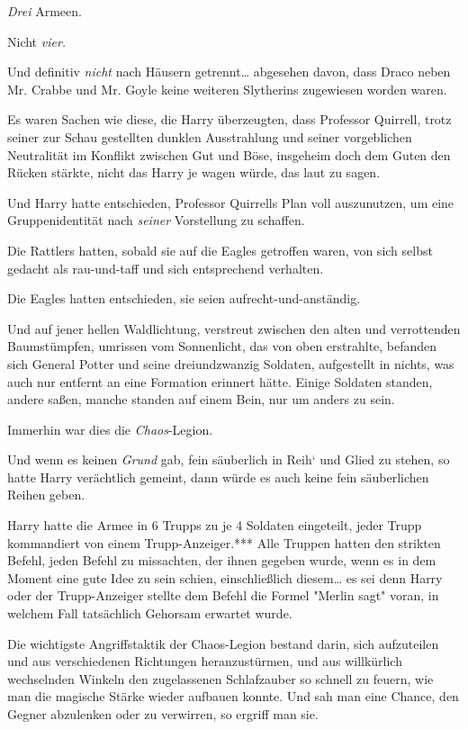 {\emph{Drei} Armeen.

Nicht \emph{vier.}

Und definitiv \emph{nicht} nach Häusern getrennt… abgesehen davon, dass Draco neben Mr. Crabbe und Mr. Goyle keine weiteren Slytherins zugewiesen worden waren.

Es waren Sachen wie diese, die Harry überzeugten, dass Professor Quirrell, trotz seiner zur Schau gestellten dunklen Ausstrahlung und seiner vorgeblichen Neutralität im Konflikt zwischen Gut und Böse, insgeheim doch dem Guten den Rücken stärkte, nicht das Harry je wagen würde, das laut zu sagen.

Und Harry hatte entschieden, Professor Quirrells Plan voll auszunutzen, um eine Gruppenidentität nach \emph{seiner} Vorstellung zu schaffen.

Die Rattlers hatten, sobald sie auf die Eagles getroffen waren, von sich selbst gedacht als rau-und-taff und sich entsprechend verhalten.

Die Eagles hatten entschieden, sie seien aufrecht-und-anständig.

Und auf jener hellen Waldlichtung, verstreut zwischen den alten und verrottenden Baumstümpfen, umrissen vom Sonnenlicht, das von oben erstrahlte, befanden sich General Potter und seine dreiundzwanzig Soldaten, aufgestellt in nichts, was auch nur entfernt an eine Formation erinnert hätte. Einige Soldaten standen, andere saßen, manche standen auf einem Bein, nur um anders zu sein.

Immerhin war dies die \emph{Chaos}-Legion.

Und wenn es keinen \emph{Grund} gab, fein säuberlich in Reih` und Glied zu stehen, so hatte Harry verächtlich gemeint, dann würde es auch keine fein säuberlichen Reihen geben.

Harry hatte die Armee in 6 Trupps zu je 4 Soldaten eingeteilt, jeder Trupp kommandiert von einem Trupp-Anzeiger.*** Alle Truppen hatten den strikten Befehl, jeden Befehl zu missachten, der ihnen gegeben wurde, wenn es in dem Moment eine gute Idee zu sein schien, einschließlich diesem… es sei denn Harry oder der Trupp-Anzeiger stellte dem Befehl die Formel "Merlin sagt" voran, in welchem Fall tatsächlich Gehorsam erwartet wurde.

Die wichtigste Angriffstaktik der Chaos-Legion bestand darin, sich aufzuteilen und aus verschiedenen Richtungen heranzustürmen, und aus willkürlich wechselnden Winkeln den zugelassenen Schlafzauber so schnell zu feuern, wie man die magische Stärke wieder aufbauen konnte. Und sah man eine Chance, den Gegner abzulenken oder zu verwirren, so ergriff man sie.

}
